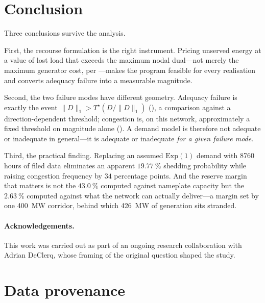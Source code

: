 \documentclass[11pt,a4paper]{article}
\theoremstyle{definition}
\theoremstyle{plain}
\theoremstyle{remark}
\begin{document}
\section{Conclusion}\label{sec:conclusion}

Three conclusions survive the analysis.

First, the recourse formulation is the right instrument. Pricing unserved energy
at a value of lost load that exceeds the maximum nodal dual---not merely the
maximum generator cost, per ---makes the program feasible for
every realisation and converts adequacy failure into a measurable magnitude.

Second, the two failure modes have different geometry. Adequacy failure is
exactly the event $\lVert D\rVert_1 > T^\star(D/\lVert D\rVert_1)$
(), a comparison against a direction-dependent threshold;
congestion is, on this network, approximately a fixed threshold on magnitude
alone (). A demand model is therefore not adequate or
inadequate in general---it is adequate or inadequate \emph{for a given failure
mode}.

Third, the practical finding. Replacing an assumed $\mathrm{Exp}(1)$ demand with
\num{8760} hours of filed data eliminates an apparent $\SI{19.77}{\percent}$
shedding probability while raising congestion frequency by $34$ percentage
points. And the reserve margin that matters is not the
$\SI{43.0}{\percent}$ computed against nameplate capacity but the
$\SI{2.63}{\percent}$ computed against what the network can actually deliver---a
margin set by one \SI{400}{\mega\watt} corridor, behind which
\SI{426}{\mega\watt} of generation sits stranded.

\paragraph{Acknowledgements.}
This work was carried out as part of an ongoing research collaboration with
Adrian DeClerq, whose framing of the original question shaped the study.

\appendix
\section{Data provenance}\label{app:data}
\end{document}
